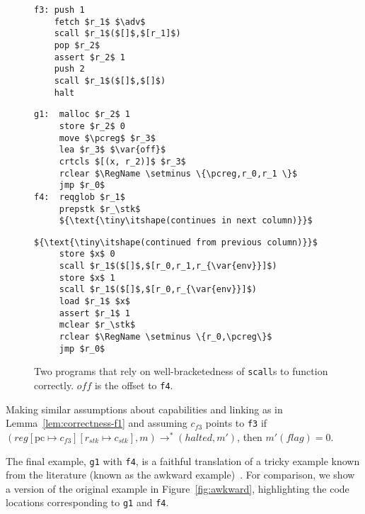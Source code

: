 \documentclass[format=acmsmall, review=true, screen=true]{acmart}
\newcommand{\update}[2]{[#1 \mapsto #2]}
\newcommand{\var}[1]{\mathit{#1}}
\newcommand{\pcreg}{\mathrm{pc}}
\newcommand{\reg}{\var{reg}}
\newcommand{\adv}{\var{adv}}
\newcommand{\stk}{\var{stk}}
\newcommand{\flag}{\var{flag}}
\newcommand{\halted}{\mathit{halted}}
\newcommand{\plaindom}[1]{\mathrm{#1}}
\newcommand{\RegName}{\plaindom{RegName}}
\newcommand{\step}[1][]{\rightarrow_{#1}}
\begin{document}
\begin{figure}[t]
  \centering
  \begin{minipage}[t]{.25\linewidth}
  \begin{lstlisting}
f3: push 1
    fetch $r_1$ $\adv$
    scall $r_1$($[]$,$[r_1]$)
    pop $r_2$
    assert $r_2$ 1
    push 2
    scall $r_1$($[]$,$[]$)
    halt
\end{lstlisting}
  \end{minipage}%
  \begin{minipage}[t]{.37\linewidth}
  \begin{lstlisting}
g1:  malloc $r_2$ 1
     store $r_2$ 0
     move $\pcreg$ $r_3$
     lea $r_3$ $\var{off}$
     crtcls $[(x, r_2)]$ $r_3$
     rclear $\RegName \setminus \{\pcreg,r_0,r_1 \}$
     jmp $r_0$
f4:  reqglob $r_1$
     prepstk $r_\stk$
     ${\text{\tiny\itshape(continues in next column)}}$
\end{lstlisting}
  \end{minipage}%
  \begin{minipage}[t]{.37\linewidth}
\begin{lstlisting}[firstnumber=last]
     ${\text{\tiny\itshape(continued from previous column)}}$
     store $x$ 0
     scall $r_1$($[]$,$[r_0,r_1,r_{\var{env}}]$)
     store $x$ 1
     scall $r_1$($[]$,$[r_0,r_{\var{env}}]$)
     load $r_1$ $x$
     assert $r_1$ 1
     mclear $r_\stk$
     rclear $\RegName \setminus \{r_0,\pcreg\}$
     jmp $r_0$
\end{lstlisting}
  \end{minipage}
  \caption{ Two programs that rely on well-bracketedness of
    \texttt{scall}s to function correctly. $\var{off}$ is the
    offset to \texttt{f4}.}
  \label{fig:prog-f3-and-g1}
\end{figure}

\begin{lemma}
  \label{lem:correctness-f3}
  Making similar assumptions about capabilities and linking as in
  Lemma~\ref{lem:correctness-f1} and assuming $c_{f3}$ points to \texttt{f3}
  if $(\reg\update{\pcreg}{c_{f3}}\update{r_\stk}{c_\stk},m) \step^*
  (\halted,m')$, then $m'(\flag) = 0$.
\end{lemma}

The final example, \texttt{g1} with \texttt{f4}, is a faithful translation of a tricky example known from the literature (known as the awkward example)~\citep{pitts_operational_1998,Dreyer:jfp12}.
For comparison, we show a version of the original example in Figure~\ref{fig:awkward}, highlighting the code locations corresponding to \texttt{g1} and \texttt{f4}.
\end{document}
